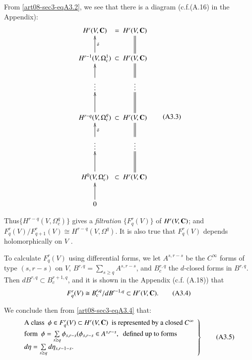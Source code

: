 From \eqref{art08-sec3-eqA3.2}, we see that there is a diagram (c.f.(A.16) in the Appendix):
\begin{equation*}
\vcenter{
\xymatrix@C=-.02cm{
H^{r}(V,\bfC) & = & H^{r}(V,\bfC)\\
H^{r-1}(V,\Omega^{1}_{c})\ar[u]_-{\delta} & \subset & H^{r}(V,\bfC)\ar@{=}[u]\\
\vdots\ar[u] & & \vdots\ar@{=}[u]\\
H^{r-q}(V,\Omega^{q}_{c})\ar[u] & \subset & H^{r}(V,\bfC)\ar@{=}[u]\\
\vdots\ar[u]_-{\delta} & & \vdots\ar@{=}[u]\\
H^{0}(V,\Omega^{r}_{c})\ar[u] & \subset & H^{r}(V,\bfC)\ar@{=}[u]\\
0\ar[u] & &
}}\tag{A3.3}\label{art08-sec3-eqA3.3}
\end{equation*}

Thus\pageoriginale $\{H^{r-q}(V,\Omega^{q}_{c})\}$ gives a {\em filtration} $\{F^{r}_{q}(V)\}$ of $H^{r}(V,\mathbf{C})$; and\break $F^{r}_{q}(V)/F^{r}_{q+1}(V)\cong H^{r-q}(V,\Omega^{q})$. It is also true that $F^{r}_{q}(V)$ depends holomorphically on $V$ \cite{art08-key9}.

To calculate $F^{r}_{q}(V)$ using differential forms, we let $A^{s,r-s}$ be the $C^{\infty}$ forms of type $(s,r-s)$ on $V$, $B^{r,q}=\sum\limits_{s\geq q}A^{s,r-s}$, and $B^{r,q}_{c}$ the $d$-closed forms in $B^{r,q}$. Then $dB^{r,q}\subset B^{r+1,q}_{c}$, and it is shown in the Appendix (c.f. (A.18)) that
\begin{equation*}
F^{r}_{q}(V)\cong B^{r,q}_{c}/dB^{r-1,q}\subset H^{r}(V,\mathbf{C}).\tag{A3.4}\label{art08-sec3-eqA3.4}
\end{equation*}

We conclude then from \eqref{art08-sec3-eqA3.4} that:
\begin{equation*}
\left.
\begin{array}{@{}l}
\text{A class~ } \phi\in F^{r}_{q}(V)\subset H^{r}(V,\bfC)\text{~ is represented by a closed } C^{\infty}\\[4pt]
\text{form~ } \phi=\sum\limits_{s\geq q}\phi_{s,r-s}(\phi_{s,r-s}\in A^{s,r-s},\text{~ defined up to forms}\\[4pt]
d\eta=\sum\limits_{s\geq q}d\eta_{s,r-1-s}. 
\end{array}
\right\}\tag{A3.5}\label{art08-sec3-eqA3.5}
\end{equation*}


